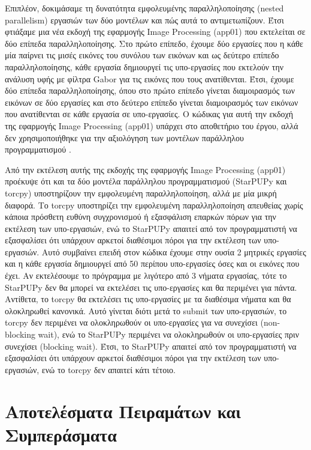 Επιπλέον, δοκιμάσαμε τη δυνατότητα εμφολευμένης παραλληλοποίησης (nested parallelism) εργασιών των δύο μοντέλων και πώς αυτά το αντιμετωπίζουν. Έτσι φτιάξαμε μια νέα εκδοχή της εφαρμογής Image Processing (app01) που εκτελείται σε δύο επίπεδα παραλληλοποίησης. Στο πρώτο επίπεδο, έχουμε δύο εργασίες που η κάθε μία παίρνει τις μισές εικόνες του συνόλου των εικόνων και ως δεύτερο επίπεδο παραλληλοποίησης, κάθε εργασία δημιουργεί τις υπο-εργασίες που εκτελούν την ανάλυση υφής με φίλτρα Gabor για τις εικόνες που τους ανατίθενται. Έτσι, έχουμε δύο επίπεδα παραλληλοποίησης, όπου στο πρώτο επίπεδο γίνεται διαμοιρασμός των εικόνων σε δύο εργασίες και στο δεύτερο επίπεδο γίνεται διαμοιρασμός των εικόνων που ανατίθενται σε κάθε εργασία σε υπο-εργασίες. Ο κώδικας για αυτή την εκδοχή της εφαρμογής Image Processing (app01) υπάρχει στο αποθετήριο του έργου, αλλά δεν χρησιμοποιήθηκε για την αξιολόγηση των μοντέλων παράλληλου προγραμματισμού \cite{appcode}.

Από την εκτέλεση αυτής της εκδοχής της εφαρμογής Image Processing (app01) προέκυψε ότι
και τα δύο μοντέλα παράλληλου προγραμματισμού (StarPUPy και torcpy) υποστηρίζουν την εμφολευμένη παραλληλοποίηση, αλλά με μία μικρή διαφορά. Το torcpy υποστηρίζει την εμφολευμένη παραλληλοποίηση απευθείας χωρίς κάποια πρόσθετη ευθύνη συγχρονισμού ή εξασφάλιση επαρκών πόρων για την εκτέλεση των υπο-εργασιών, ενώ το StarPUPy απαιτεί από τον προγραμματιστή να εξασφαλίσει ότι υπάρχουν αρκετοί διαθέσιμοι πόροι για την εκτέλεση των υπο-εργασιών. Αυτό συμβαίνει επειδή στον κώδικα έχουμε στην ουσία 2 μητρικές εργασίες και η κάθε εργασία δημιουργεί από 50 περίπου υπο-εργασίες όσες και οι εικόνες που έχει. Αν εκτελέσουμε το πρόγραμμα με λιγότερο από 3 νήματα εργασίας, τότε το StarPUPy δεν θα μπορεί να εκτελέσει τις υπο-εργασίες και θα περιμένει για πάντα. Αντίθετα, το torcpy θα εκτελέσει τις υπο-εργασίες με τα διαθέσιμα νήματα και θα ολοκληρωθεί κανονικά. Αυτό γίνεται διότι μετά το submit των υπο-εργασιών, το torcpy δεν περιμένει να ολοκληρωθούν οι υπο-εργασίες για να συνεχίσει (non-blocking wait), ενώ το StarPUPy περιμένει να ολοκληρωθούν οι υπο-εργασίες πριν συνεχίσει (blocking wait). Έτσι, το StarPUPy απαιτεί από τον προγραμματιστή να εξασφαλίσει ότι υπάρχουν αρκετοί διαθέσιμοι πόροι για την εκτέλεση των υπο-εργασιών, ενώ το torcpy δεν απαιτεί κάτι τέτοιο.

\section{Αποτελέσματα Πειραμάτων και Συμπεράσματα}

